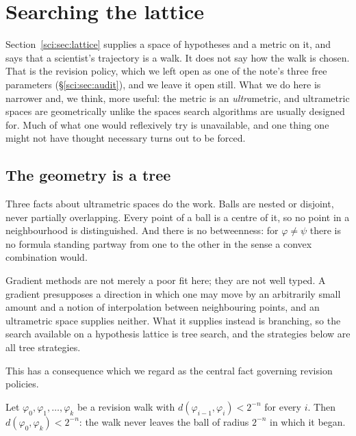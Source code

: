 \section{Searching the lattice}\label{sci:S6}
\label{sci:sec:search}

Section~\ref{sci:sec:lattice} supplies a space of hypotheses and a metric on it, and says that a scientist's
trajectory is a walk. It does not say how the walk is chosen. That is the revision policy, which we
left open as one of the note's three free parameters (\S\ref{sci:sec:audit}), and we leave it open still.
What we do here is narrower and, we think, more useful: the metric is an \emph{ultra}metric, and
ultrametric spaces are geometrically unlike the spaces search algorithms are usually designed for. Much
of what one would reflexively try is unavailable, and one thing one might not have thought necessary
turns out to be forced.

\subsection{The geometry is a tree}\label{sci:S6.1}

Three facts about ultrametric spaces do the work. Balls are nested or disjoint, never partially
overlapping. Every point of a ball is a centre of it, so no point in a neighbourhood is distinguished.
And there is no betweenness: for $\varphi \ne \psi$ there is no formula standing partway from one to
the other in the sense a convex combination would.

\begin{remark}
\label{sci:rem:nogradient}
Gradient methods are not merely a poor fit here; they are not well typed. A gradient presupposes a
direction in which one may move by an arbitrarily small amount and a notion of interpolation between
neighbouring points, and an ultrametric space supplies neither. What it supplies instead is branching,
so the search available on a hypothesis lattice is tree search, and the strategies below are all tree
strategies.
\end{remark}

This has a consequence which we regard as the central fact governing revision policies.

\begin{proposition}[Confinement]
\label{sci:prop:confinement}
Let $\varphi_0, \varphi_1, \ldots, \varphi_k$ be a revision walk with
$d(\varphi_{i-1}, \varphi_i) < 2^{-n}$ for every $i$. Then $d(\varphi_0, \varphi_k) < 2^{-n}$: the
walk never leaves the ball of radius $2^{-n}$ in which it began.
\end{proposition}

